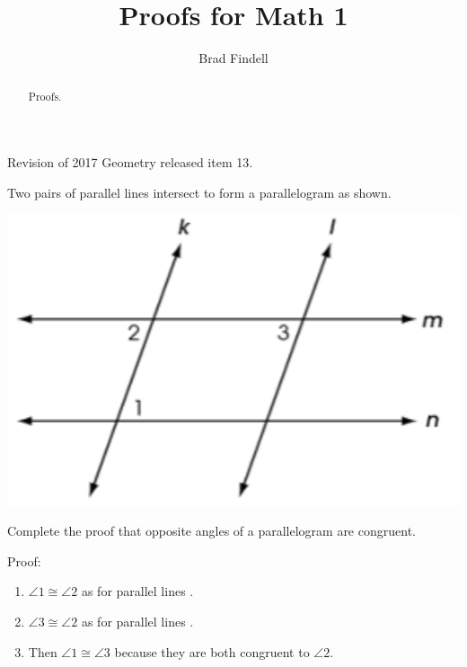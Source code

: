 \documentclass[nooutcomes]{ximera}
\title{Proofs for Math 1}
\author{Brad Findell}
\begin{document}
\begin{abstract}
Proofs. 
\end{abstract}
\maketitle


\begin{problem}
Revision of 2017 Geometry released item 13. 

Two pairs of parallel lines intersect to form a parallelogram as shown.  
\begin{image}
\includegraphics{Q13.png}
\end{image}
Complete the proof that opposite angles of a parallelogram are congruent. 

Proof: 

\begin{enumerate}
\item $\angle 1 \cong \angle 2$ as 
for parallel lines .

\item $\angle 3 \cong \angle 2$ as for parallel lines .
\item Then $\angle 1 \cong \angle 3$ because they are both congruent 
to $\angle 2$. 
\end{enumerate}
\end{problem}
\end{document}
